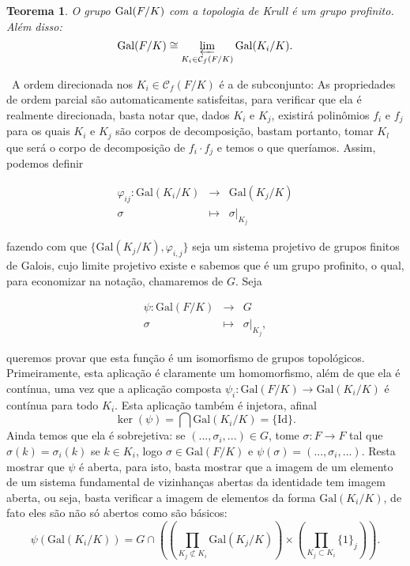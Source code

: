\documentclass[12pt,a4paper]{article}
\newtheorem{thrm}[mydef]{Teorema}
\def\dem{\par\smallbreak\noindent {\textit{ Demonstração:}} \ }
\theoremstyle{definition}
\begin{document}
\begin{thrm}

    O grupo $\text{\upshape Gal\itshape}(F/K)$ com a topologia de Krull é um grupo profinito. Além disso: $$\text{\upshape Gal\itshape}(F/K) \cong \varprojlim_{K_i \in \mathcal{C}_f (F/K)} \text{\upshape Gal\itshape}(K_i/K).$$

\end{thrm}

\dem A ordem direcionada nos $K_i \in \mathcal{C}_f (F/K)$ é a de subconjunto: As propriedades de ordem parcial são automaticamente satisfeitas, para verificar que ela é realmente direcionada, basta notar que, dados $K_i$ e $K_j$, existirá polinômios $f_i$ e $f_j$ para os quais $K_i$ e $K_j$ são corpos de decomposição, bastam portanto, tomar $K_l$ que será o corpo de decomposição de $f_i\cdot f_j$ e temos o que queríamos. Assim, podemos definir 

$$\begin{array}{rcl}
    \varphi_{ij}:\text{Gal}(K_i/K) & \longrightarrow & \text{Gal}(K_j/K) \\
    \sigma & \longmapsto & \sigma|_{K_j} 
\end{array}$$

fazendo com que $\{\text{Gal}(K_j/K), \varphi_{i,j}\}$ seja um sistema projetivo de grupos finitos de Galois, cujo limite projetivo existe e sabemos que é um grupo profinito, o qual, para economizar na notação, chamaremos de $G$. Seja 

$$\begin{array}{rcl}
    \psi : \text{Gal}(F/K) & \longrightarrow & G \\
    \sigma & \longmapsto & \sigma|_{K_j}, 
\end{array}$$

queremos provar que esta função é um isomorfismo de grupos topológicos. Primeiramente, esta aplicação é claramente um homomorfismo, além de que ela é contínua, uma vez que a aplicação composta $\psi_i: \text{Gal}(F/K) \rightarrow  \text{Gal}(K_i/K)$ é contínua para todo $K_i$. Esta aplicação também é injetora, afinal $$\ker (\psi)=\bigcap  \text{Gal}(K_i/K) = \{\text{Id}\}.$$ Ainda temos que ela é sobrejetiva: se $(... , \sigma_i , ... )\in G$, tome $\sigma:F\rightarrow F$ tal que $\sigma(k)=\sigma_i(k)$ se $k\in K_i$, logo $\sigma \in \text{Gal}(F/K)$ e $\psi(\sigma)=(... , \sigma_i , ... )$. Resta mostrar que $\psi$ é aberta, para isto, basta mostrar que a imagem de um elemento de um sistema fundamental de vizinhanças abertas da identidade tem imagem aberta, ou seja, basta verificar a imagem de elementos da forma $\text{Gal}(K_i/K)$, de fato eles são não só abertos como são básicos: $$\psi\left( \text{Gal}(K_i/K) \right)=G\cap\left( \left(\prod_{K_j\not\subset K_i} \text{Gal}(K_j/K) \right)\times \left( \prod_{K_j\subset K_i} \{1\}_j \right) \right).$$ 
\end{document}
